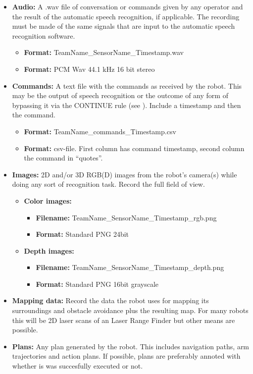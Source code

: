     \begin{itemize}
    \item \textbf{Audio: } A .wav file of conversation or commands given by any operator and the result of the automatic speech recognition, if applicable.
      The recording must be made of the same signals that are input to the automatic speech recognition software. 
      \begin{itemize}
	\item \textbf{Format: } TeamName\_SensorName\_Timestamp.wav
	\item \textbf{Format: } PCM Wav 44.1 kHz 16 bit stereo
      \end{itemize}
      
    \item \textbf{Commands: } A text file with the commands as received by the robot. 
      This may be the output of speech recognition or the outcome of any form of bypassing it via the CONTINUE rule (see ).
      Include a timestamp and then the command. 
      \begin{itemize}
	\item \textbf{Format: } TeamName\_commands\_Timestamp.csv
	\item \textbf{Format: } csv-file. First column has command timestamp, second column the command in ``quotes''.
      \end{itemize}
    
    \item \textbf{Images: } 2D and/or 3D RGB(D) images from the robot's camera(s) while doing any sort of recognition task.
			    Record the full field of view. 
    \begin{itemize}
      \item
	\textbf{Color images: } 
	\begin{itemize}
	  \item \textbf{Filename: } TeamName\_SensorName\_Timestamp\_rgb.png
	  \item \textbf{Format: } Standard PNG 24bit
	\end{itemize}
      \item
	\textbf{Depth images: } 
	\begin{itemize}
	  \item \textbf{Filename: } TeamName\_SensorName\_Timestamp\_depth.png
	  \item \textbf{Format: } Standard PNG 16bit grayscale
	\end{itemize}
    \end{itemize}
    
    \item \textbf{Mapping data: } Record the data the robot uses for mapping its surroundings and obstacle avoidance plus the resulting map. 
      For many robots this will be 2D laser scans of an Laser Range Finder but other means are possible. 
    
    \item \textbf{Plans: } Any plan generated by the robot. This includes navigation paths, arm trajectories and action plans. 
      If possible, plans are preferably annoted with whether is was succesfully executed or not.
    \end{itemize}
    
